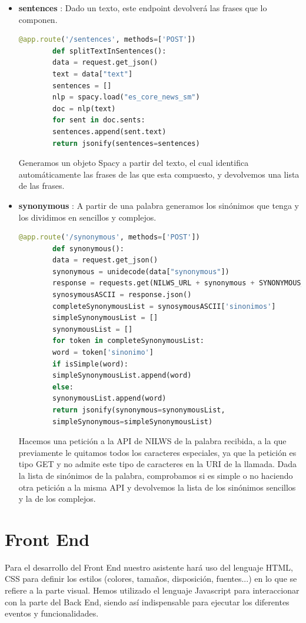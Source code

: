 \begin{itemize}
	\item \textbf{sentences} \label{sentences}: Dado un texto, este endpoint devolverá las frases que lo componen.
	\begin{lstlisting}[language=Python]
		@app.route('/sentences', methods=['POST'])
		def splitTextInSentences():
		data = request.get_json()
		text = data["text"]
		sentences = []
		nlp = spacy.load("es_core_news_sm")
		doc = nlp(text)
		for sent in doc.sents:
		sentences.append(sent.text)
		return jsonify(sentences=sentences)
	\end{lstlisting}
	Generamos un objeto Spacy a partir del texto, el cual identifica automáticamente las frases de las que esta compuesto, y devolvemos una lista de las frases.
	
	\item \textbf{synonymous} \label{synonymous}: A partir de una palabra generamos los sinónimos que tenga y los dividimos en sencillos y complejos.
	\begin{lstlisting}[language=Python]
		@app.route('/synonymous', methods=['POST'])
		def synonymous():
		data = request.get_json()
		synonymous = unidecode(data["synonymous"])
		response = requests.get(NILWS_URL + synonymous + SYNONYMOUS_URL)
		synosymousASCII = response.json()
		completeSynonymousList = synosymousASCII['sinonimos']
		simpleSynonymousList = []
		synonymousList = []
		for token in completeSynonymousList:
		word = token['sinonimo']
		if isSimple(word):
		simpleSynonymousList.append(word)
		else:
		synonymousList.append(word)
		return jsonify(synonymous=synonymousList, 
		simpleSynonymous=simpleSynonymousList)	
	\end{lstlisting}
	Hacemos una petición a la API de NILWS de la palabra recibida, a la que previamente le quitamos todos los caracteres especiales, ya que la petición es tipo GET y no admite este tipo de caracteres en la URI de la llamada.
	Dada la lista de sinónimos de la palabra, comprobamos si es simple o no haciendo otra petición a la misma API y devolvemos la lista de los sinónimos sencillos y la de los complejos.
	
\end{itemize}



\section{Front End}\label{sec:frontend}

Para el desarrollo del Front End nuestro asistente hará uso del lenguaje HTML, CSS para definir los estilos (colores, tamaños, disposición, fuentes...) en lo que se refiere a la parte visual. Hemos utilizado el lenguaje Javascript para interaccionar con la parte del Back End, siendo así indispensable para ejecutar los diferentes eventos y funcionalidades.
 
